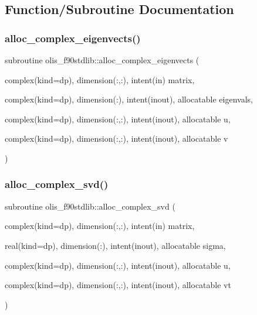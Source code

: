 \subsection{Function/\+Subroutine Documentation}
\mbox{\label{namespaceolis__f90stdlib_af0119bd404337367bc0727decf6dd89c}} 
\subsubsection{\texorpdfstring{alloc\+\_\+complex\+\_\+eigenvects()}{alloc\_complex\_eigenvects()}}
{\footnotesize\ttfamily subroutine olis\+\_\+f90stdlib\+::alloc\+\_\+complex\+\_\+eigenvects (\begin{DoxyParamCaption}\item[{complex(kind=dp), dimension(\+:,\+:), intent(in)}]{matrix,  }\item[{complex(kind=dp), dimension(\+:), intent(inout), allocatable}]{eigenvals,  }\item[{complex(kind=dp), dimension(\+:,\+:), intent(inout), allocatable}]{u,  }\item[{complex(kind=dp), dimension(\+:,\+:), intent(inout), allocatable}]{v }\end{DoxyParamCaption})}

\mbox{\label{namespaceolis__f90stdlib_a31420ff7579f33919c00c26753b56612}} 
\subsubsection{\texorpdfstring{alloc\+\_\+complex\+\_\+svd()}{alloc\_complex\_svd()}}
{\footnotesize\ttfamily subroutine olis\+\_\+f90stdlib\+::alloc\+\_\+complex\+\_\+svd (\begin{DoxyParamCaption}\item[{complex(kind=dp), dimension(\+:,\+:), intent(in)}]{matrix,  }\item[{real(kind=dp), dimension(\+:), intent(inout), allocatable}]{sigma,  }\item[{complex(kind=dp), dimension(\+:,\+:), intent(inout), allocatable}]{u,  }\item[{complex(kind=dp), dimension(\+:,\+:), intent(inout), allocatable}]{vt }\end{DoxyParamCaption})}

